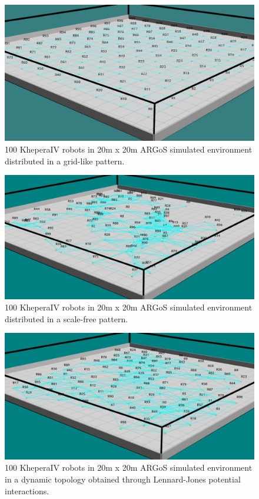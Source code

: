 \begin{figure}[htbp]
	\centering
    \includegraphics[width=\columnwidth]{images/argos_grid_link.png}
    \caption[Grid formation in ARGoS]{100 KheperaIV robots in 20m x 20m  ARGoS simulated environment distributed in a grid-like pattern.}
    \label{argos:grid}
\end{figure}

\begin{figure}[htbp]
	\centering
    \includegraphics[width=\columnwidth]{images/argos_scale_free.png}
    \caption[Scale-free formation in ARGoS]{100 KheperaIV robots in 20m x 20m  ARGoS simulated environment distributed in a scale-free pattern.}
    \label{argos:scale-free}
\end{figure}

\begin{figure}[htbp]
	\centering
    \includegraphics[width=\columnwidth]{images/argos_lennard.png}
    \caption[Lennard-Jones potential formation in ARGoS]{100 KheperaIV robots in 20m x 20m  ARGoS simulated environment in a dynamic topology obtained through Lennard-Jones potential interactions.}
    \label{argos:lennard-jones}
\end{figure}

